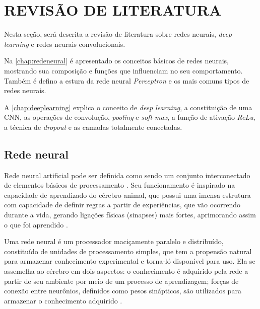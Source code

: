 
\chapter{REVISÃO DE LITERATURA}
\label{chap:fundamentacaoTeorica}

Nesta seção, será descrita a revisão de literatura sobre redes neurais, \textit{deep learning} e redes neurais convolucionais.
\par Na \autoref{chap:redeneural} é apresentado os conceitos básicos de redes neurais, mostrando sua composição e funções que influenciam no seu comportamento. Também é defino a estura da rede neural \textit{Perceptron} e os mais comuns tipos de redes neurais.
\par A \autoref{chap:deeplearning} explica o conceito de \textit{deep learning}, a constituição de uma CNN, as operações de convolução, \textit{pooling} e \textit{soft max}, a função de ativação \textit{ReLu}, a técnica de \textit{dropout} e as camadas totalmente conectadas.  

\section{Rede neural}
\label{chap:redeneural}
Rede neural artificial pode ser definida como sendo um conjunto interconectado de elementos básicos de processamento \cite{Gurney1997}. Seu funcionamento é inspirado na capacidade de aprendizado do cérebro animal, que possui uma imensa estrutura com capacidade de definir regras a partir de experiências, que vão ocorrendo durante a vida, gerando ligações físicas (sinapses) mais fortes, aprimorando assim o que foi aprendido \cite{haykin2001}.
\begin{citacao}
  Uma rede neural é um processador maciçamente paralelo e distribuído, constituído de unidades de processamento simples, que tem a propensão natural para armazenar conhecimento experimental e torna-ló disponível para uso. Ela se assemelha ao cérebro em dois aspectos: o conhecimento é adquirido pela rede a partir de seu ambiente por meio de um processo de aprendizagem; forças de conexão entre neurônios, definidos como pesos sinápticos, são utilizados para armazenar o conhecimento adquirido \cite{haykin2001}.
\end{citacao}

